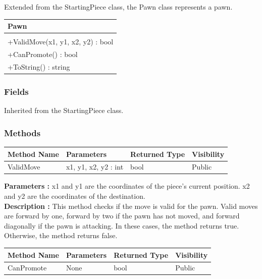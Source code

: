 \documentclass[12pt]{article}
\begin{document}
    Extended from the StartingPiece class, the Pawn class represents a pawn.
\begin{table}[H]
    \begin{tabular}{|l|}
    \hline
    \cellcolor[HTML]{C0C0C0}\textbf{Pawn} \\ \hline
    \cellcolor[HTML]{EFEFEF}                    \\ \hline
    +ValidMove(x1, y1, x2, y2) : bool           \\ \hline
    +CanPromote() : bool                        \\ \hline
    +ToString() : string                        \\ \hline
    \end{tabular}
\end{table}

\subsubsection{Fields}

    Inherited from the StartingPiece class.

\subsubsection{Methods}

\begin{table}[H]
    \begin{tabular}{|l|l|l|l|}
    \hline
    \rowcolor[HTML]{EFEFEF} 
    \cellcolor[HTML]{EFEFEF}\textbf{Method Name} & \textbf{Parameters}  & \textbf{Returned Type} & \textbf{Visibility} \\ \hline
    ValidMove                          & x1, y1, x2, y2 : int & bool                   & Public              \\ \hline
    \end{tabular}
\end{table}

    \textbf{Parameters :} x1 and y1 are the coordinates of the piece's current position.
    x2 and y2 are the coordinates of the destination.
\\
    \textbf{Description :} This method checks if the move is valid for the pawn. 
    Valid moves are forward by one, forward by two if the pawn has not moved, and forward diagonally if the pawn is attacking.
    In these cases, the method returns true.
    Otherwise, the method returns false.

\begin{table}[H]
    \begin{tabular}{|l|l|l|l|}
    \hline
    \rowcolor[HTML]{EFEFEF} 
    \cellcolor[HTML]{EFEFEF}\textbf{Method Name} & \textbf{Parameters}  & \textbf{Returned Type} & \textbf{Visibility} \\ \hline
    CanPromote                                   & None                 & bool                   & Public              \\ \hline
    \end{tabular}
\end{table}
\end{document}
